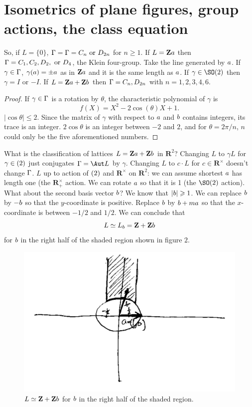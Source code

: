 \documentclass[11pt, oneside]{amsart}
\numberwithin{equation}{section}
\numberwithin{theorem}{section}
\theoremstyle{definition}
\let\O\relax
\let\bar\relax
\let\bf\relax
\def\Z{\mathbf{Z}}
\def\R{\mathbf{R}}
\begin{document}
{\section{Isometrics of plane figures, group actions, the class equation}
So, if $L=\{0\}$, $\Gamma=\bar{\Gamma} = C_n \textrm{ or } D_{2n}$ for $n\geqslant 1$. If $L=\Z\bf a$ then $\bar\Gamma = C_1, C_2, D_2, \textrm{ or } D_4$, the Klein four-group. Take the line generated by $\bf a$. If $\gamma\in\bar\Gamma$, $\gamma(\bf a) = \pm \bf a$ as in $\Z\bf a$ and it is the same length as $\bf a$. If $\gamma\in\SO(2)$ then $\gamma = I$ or $-I$. If $L =\Z\bf a +\Z\bf b$ then  $\bar\Gamma = C_n, D_{2n}$ with $n=1,2,3,4,6$.
\begin{proof}
If $\gamma\in\bar\Gamma$ is a rotation by $\theta$, the characteristic polynomial of $\gamma$ is 
$$
f(X) = X^2 - 2\cos(\theta)X + 1.
$$
$|\cos\theta|\leqslant 2$. Since the matrix of $\gamma$ with respect to $\bf a$ and $\bf b$ contains integers, its trace is an integer. $2\cos\theta$ is an integer between $-2$ and $2$, and for $\theta = 2\pi/n$, $n$ could only be the five aforementioned numbers.
\end{proof}
What is the classification of lattices $L=\Z\bf a+\Z\bf b$ in $\R^2$? Changing $L$ to $\gamma L$ for $\gamma\in \O(2)$ just conjugates $\bar\Gamma=\Aut L$ by $\gamma$. Changing $L$ to $c\cdot L$ for $c\in\R^\times$ doesn't change $\bar\Gamma$. 
$L$ up to action of $\O(2)$ and $\R^\times$ on $\R^2$: we can assume shortest $\bf a$ has length one (the $\R_+^\times$ action. We can rotate $\bf a$ so that it is 1 (the $\SO(2)$ action). What about the second basis vector $\bf b$? We know that $|\bf b| \geqslant 1$. We can replace $\bf b$ by $-\bf b$ so that the $y$-coordinate is positive. Replace $\bf b$ by $\bf b + m\bf a$ so that the $x$-coordinate is between $-1/2$ and $1/2$. We can conclude that 
$$
L \simeq L_\bf b =\Z +\Z\bf b
$$ 
for $\bf b$ in the right half of the shaded region shown in figure $2$.
\begin{figure}
\centering
\includegraphics[scale=0.5]{images/lattice_bases}
\caption{$L\simeq \Z+\Z\bf b$ for $\bf b$ in the right half of the shaded region.}
\end{figure}

}
\end{document}
